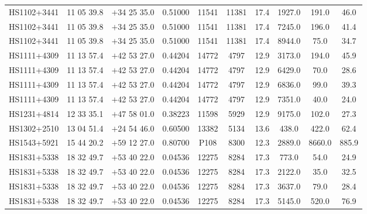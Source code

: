 \begin{landscape}
\begin{center}
\begin{longtable}{l c c c c c c c c c}
HS1102+3441  &             11 05 39.8  &         $+$34 25 35.0  &       0.51000  & 11541  &   11381  &      17.4  &      1927.0  &  191.0  &  46.0  \\
HS1102+3441  &             11 05 39.8  &         $+$34 25 35.0  &       0.51000  & 11541  &   11381  &      17.4  &      7245.0  &  196.0  &  41.4  \\
HS1102+3441  &             11 05 39.8  &         $+$34 25 35.0  &       0.51000  & 11541  &   11381  &      17.4  &      8944.0  &  75.0  &   34.7  \\
HS1111+4309  &             11 13 57.4  &         $+$42 53 27.0  &       0.44204  & 14772  &   4797  &       12.9  &      3173.0  &  194.0  &  45.9  \\
HS1111+4309  &             11 13 57.4  &         $+$42 53 27.0  &       0.44204  & 14772  &   4797  &       12.9  &      6429.0  &  70.0  &   28.6  \\
HS1111+4309  &             11 13 57.4  &         $+$42 53 27.0  &       0.44204  & 14772  &   4797  &       12.9  &      6836.0  &  99.0  &   39.3  \\
HS1111+4309  &             11 13 57.4  &         $+$42 53 27.0  &       0.44204  & 14772  &   4797  &       12.9  &      7351.0  &  40.0  &   24.0  \\
HS1231+4814  &             12 33 35.1  &         $+$47 58 01.0  &       0.38223  & 11598  &   5929  &       12.9  &      9175.0  &  102.0  &  27.3  \\
HS1302+2510  &             13 04 51.4  &         $+$24 54 46.0  &       0.60500  & 13382  &   5134  &       13.6  &      438.0  &   422.0  &  62.4  \\
HS1543+5921  &             15 44 20.2  &         $+$59 12 27.0  &       0.80700  & P108  &    8300  &       12.3  &      2889.0  &  8660.0  & 885.9  \\
HS1831+5338  &             18 32 49.7  &         $+$53 40 22.0  &       0.04536  & 12275  &   8284  &       17.3  &      773.0  &   54.0  &   24.9  \\
HS1831+5338  &             18 32 49.7  &         $+$53 40 22.0  &       0.04536  & 12275  &   8284  &       17.3  &      2122.0  &  35.0  &   32.5  \\
HS1831+5338  &             18 32 49.7  &         $+$53 40 22.0  &       0.04536  & 12275  &   8284  &       17.3  &      3637.0  &  79.0  &   28.4  \\
HS1831+5338  &             18 32 49.7  &         $+$53 40 22.0  &       0.04536  & 12275  &   8284  &       17.3  &      5145.0  &  520.0  &  76.9  \\

\end{longtable}
\end{center}
\end{landscape}
